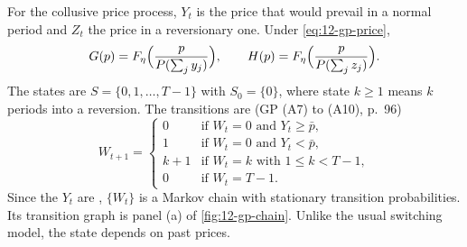 For the collusive price process, $Y_t$ is the price that would prevail in a normal period and $Z_t$ the price in a
reversionary one. Under \eqref{eq:12-gp-price},
\begin{equation*}
G(p) = F_\eta\Bigl(\frac{p}{P(\sum_j y_j)}\Bigr),
\qquad
H(p) = F_\eta\Bigl(\frac{p}{P(\sum_j z_j)}\Bigr).
\end{equation*}
The states are $S = \{0, 1, \dots, T - 1\}$ with $S_0 = \{0\}$, where state $k \ge 1$ means $k$ periods into a
reversion. The transitions are (GP (A7) to (A10), p.~96)
\begin{equation}\label{eq:12-gp-transitions}
W_{t+1} =
\begin{cases}
0 & \text{if } W_t = 0 \text{ and } Y_t \ge \bar p,\\
1 & \text{if } W_t = 0 \text{ and } Y_t < \bar p,\\
k + 1 & \text{if } W_t = k \text{ with } 1 \le k < T - 1,\\
0 & \text{if } W_t = T - 1 .
\end{cases}
\end{equation}
Since the $Y_t$ are \iid, $\{W_t\}$ is a Markov chain with stationary transition probabilities. Its transition
graph is panel (a) of \cref{fig:12-gp-chain}. Unlike the usual switching model, the state depends on past prices.

